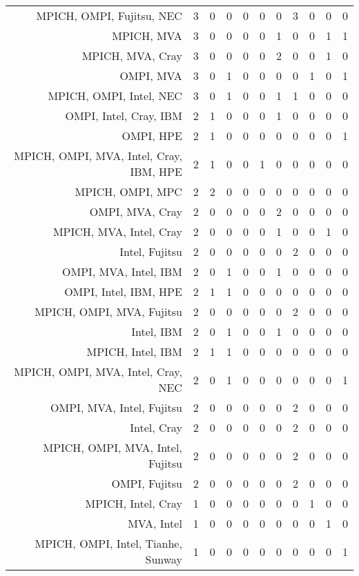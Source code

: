 {\begin{landscape}
\begin{longtable}[htb]{r|c|c|c|c|c|c|c|c|c|c}
{MPICH, OMPI, Fujitsu, NEC} & 3 & 0 & 0 & 0 & 0 & 0 & 3 & 0 & 0 & 0 \\%
{MPICH, MVA} & 3 & 0 & 0 & 0 & 0 & 1 & 0 & 0 & 1 & 1 \\%
{MPICH, MVA, Cray} & 3 & 0 & 0 & 0 & 0 & 2 & 0 & 0 & 1 & 0 \\%
{OMPI, MVA} & 3 & 0 & 1 & 0 & 0 & 0 & 0 & 1 & 0 & 1 \\%
{MPICH, OMPI, Intel, NEC} & 3 & 0 & 1 & 0 & 0 & 1 & 1 & 0 & 0 & 0 \\%
{OMPI, Intel, Cray, IBM} & 2 & 1 & 0 & 0 & 0 & 1 & 0 & 0 & 0 & 0 \\%
{OMPI, HPE} & 2 & 1 & 0 & 0 & 0 & 0 & 0 & 0 & 0 & 1 \\%
{MPICH, OMPI, MVA, Intel, Cray, IBM, HPE} & 2 & 1 & 0 & 0 & 1 & 0 & 0 & 0 & 0 & 0 \\%
{MPICH, OMPI, MPC} & 2 & 2 & 0 & 0 & 0 & 0 & 0 & 0 & 0 & 0 \\%
{OMPI, MVA, Cray} & 2 & 0 & 0 & 0 & 0 & 2 & 0 & 0 & 0 & 0 \\%
{MPICH, MVA, Intel, Cray} & 2 & 0 & 0 & 0 & 0 & 1 & 0 & 0 & 1 & 0 \\%
{Intel, Fujitsu} & 2 & 0 & 0 & 0 & 0 & 0 & 2 & 0 & 0 & 0 \\%
{OMPI, MVA, Intel, IBM} & 2 & 0 & 1 & 0 & 0 & 1 & 0 & 0 & 0 & 0 \\%
{OMPI, Intel, IBM, HPE} & 2 & 1 & 1 & 0 & 0 & 0 & 0 & 0 & 0 & 0 \\%
{MPICH, OMPI, MVA, Fujitsu} & 2 & 0 & 0 & 0 & 0 & 0 & 2 & 0 & 0 & 0 \\%
{Intel, IBM} & 2 & 0 & 1 & 0 & 0 & 1 & 0 & 0 & 0 & 0 \\%
{MPICH, Intel, IBM} & 2 & 1 & 1 & 0 & 0 & 0 & 0 & 0 & 0 & 0 \\%
{MPICH, OMPI, MVA, Intel, Cray, NEC} & 2 & 0 & 1 & 0 & 0 & 0 & 0 & 0 & 0 & 1 \\%
{OMPI, MVA, Intel, Fujitsu} & 2 & 0 & 0 & 0 & 0 & 0 & 2 & 0 & 0 & 0 \\%
{Intel, Cray} & 2 & 0 & 0 & 0 & 0 & 0 & 2 & 0 & 0 & 0 \\%
{MPICH, OMPI, MVA, Intel, Fujitsu} & 2 & 0 & 0 & 0 & 0 & 0 & 2 & 0 & 0 & 0 \\%
{OMPI, Fujitsu} & 2 & 0 & 0 & 0 & 0 & 0 & 2 & 0 & 0 & 0 \\%
{MPICH, Intel, Cray} & 1 & 0 & 0 & 0 & 0 & 0 & 0 & 1 & 0 & 0 \\%
{MVA, Intel} & 1 & 0 & 0 & 0 & 0 & 0 & 0 & 0 & 1 & 0 \\%
{MPICH, OMPI, Intel, Tianhe, Sunway} & 1 & 0 & 0 & 0 & 0 & 0 & 0 & 0 & 0 & 1 \\%

\end{longtable}
\end{landscape}}
